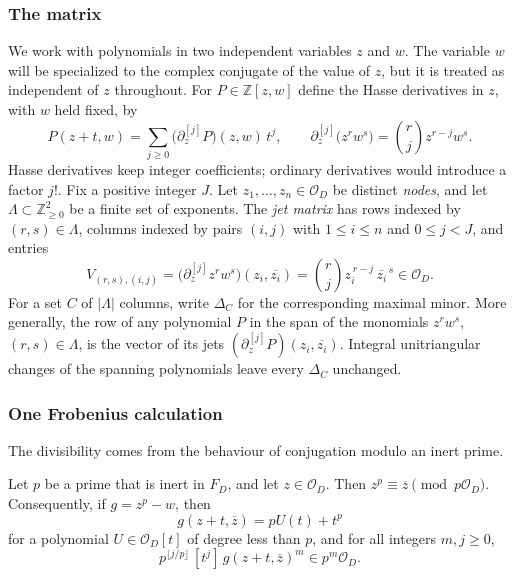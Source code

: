 \subsubsection*{The matrix}
We work with polynomials in two independent variables $z$ and $w$. The variable
$w$ will be specialized to the complex conjugate of the value of $z$, but it is
treated as independent of $z$ throughout. For $P\in\mathbb{Z}[z,w]$ define the
Hasse derivatives in $z$, with $w$ held fixed, by
\[
  P(z+t,w)=\sum_{j\ge0}\bigl(\partial_z^{[j]}P\bigr)(z,w)\,t^j,
  \qquad
  \partial_z^{[j]}\bigl(z^rw^s\bigr)=\binom rj z^{r-j}w^s .
\]
Hasse derivatives keep integer coefficients; ordinary derivatives would
introduce a factor $j!$. Fix a positive integer $J$. Let $z_1,\dots,z_n\in\mathcal{O}_D$ be
distinct \emph{nodes}, and let $\Lambda\subset\mathbb{Z}_{\ge0}^2$ be a finite
set of exponents. The \emph{jet matrix} has rows indexed by $(r,s)\in\Lambda$,
columns indexed by pairs $(i,j)$ with $1\le i\le n$ and $0\le j<J$, and entries
\begin{equation}\label{eq:jet-matrix}
  V_{(r,s),(i,j)}
  =\bigl(\partial_z^{[j]}z^rw^s\bigr)(z_i,\overline{z_i})
  =\binom rjz_i^{\,r-j}\,\overline{z_i}^{\,s}\in\mathcal{O}_D .
\end{equation}
For a set $C$ of $|\Lambda|$ columns, write $\Delta_C$ for the corresponding
maximal minor. More generally, the row of any polynomial $P$ in the span of the
monomials $z^rw^s$, $(r,s)\in\Lambda$, is the vector of its jets
$(\partial_z^{[j]}P)(z_i,\overline{z_i})$. Integral unitriangular
changes of the spanning polynomials leave every $\Delta_C$ unchanged.

\subsubsection*{One Frobenius calculation}
The divisibility comes from the behaviour of conjugation modulo an inert prime.

\begin{lemma}\label{lem:frobenius}
Let $p$ be a prime that is inert in $F_D$, and let $z\in
\mathcal{O}_D$. Then $z^p\equiv\overline z\pmod{p\mathcal{O}_D}$.
Consequently, if $g=z^p-w$, then
\[
  g(z+t,\overline z)=pU(t)+t^p
\]
for a polynomial $U\in\mathcal{O}_D[t]$ of degree less than $p$, and for all
integers $m,j\ge0$,
\begin{equation}\label{eq:layer-divisibility}
  p^{\lfloor j/p\rfloor}\,[t^j]\,g(z+t,\overline z)^m\in
  p^m\mathcal{O}_D .
\end{equation}
\end{lemma}

